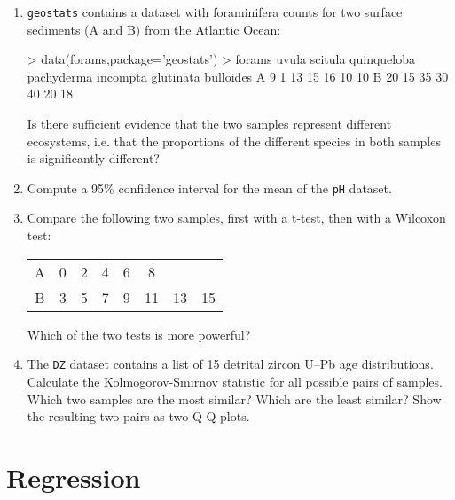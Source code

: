 \begin{enumerate}

\item \texttt{geostats} contains a dataset with foraminifera counts
  for two surface sediments (A and B) from the Atlantic Ocean:

\begin{console}
> data(forams,package='geostats')
> forams
  uvula scitula quinqueloba pachyderma incompta glutinata bulloides
A     9       1          13         15       16        10        10
B    20      15          35         30       40        20        18
\end{console}

Is there sufficient evidence that the two samples represent different
ecosystems, i.e. that the proportions of the different species in both
samples is significantly different?

\item Compute a 95\% confidence interval for the mean of the
  \texttt{pH} dataset.

\item Compare the following two samples, first with a t-test, then
  with a Wilcoxon test:
\begin{center}
\begin{tabular}{c|ccccccc}
A & 0 & 2 & 4 & 6 & 8 & & \\
B & 3 & 5 & 7 & 9 & 11 & 13 & 15
\end{tabular}
\end{center}
Which of the two tests is more powerful?
  
\item The \texttt{DZ} dataset contains a list of 15 detrital zircon
  U--Pb age distributions. Calculate the Kolmogorov-Smirnov statistic
  for all possible pairs of samples. Which two samples are the most
  similar? Which are the least similar? Show the resulting two pairs
  as two Q-Q plots.
  
\end{enumerate}

\section{Regression}
\label{sec:ex-regression}

